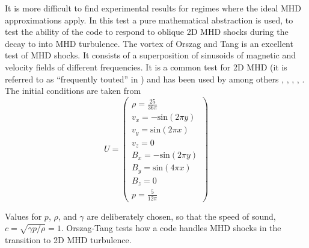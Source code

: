 It is more difficult to find experimental results for regimes where the ideal MHD approximations apply.
In this test a pure mathematical abstraction is used,
to test the ability of the code to respond to oblique 2D MHD shocks during the decay to into MHD turbulence.
The vortex of Orszag and Tang \citep{1979JFM....90..129O} is an excellent test of MHD shocks. 
It consists of a superposition of sinusoids of magnetic and velocity fields of different frequencies. 
It is a common test for 2D MHD (it is referred to as ``frequently touted'' in \citet{2006ApJS..165..188H} ) and has been used by among others 
\cite{2000ApJ...530..508L}, \citet{1999osullivan}, \cite{1998ApJ...494..317D}, \cite{1998ApJ...509..244R}, \citet{1995ApJ...452..785R}.
The initial conditions are taken from \citet{1999osullivan}
\begin{equation}
U = \left( 
\begin{array}{c}
\rho = \frac{25}{36\pi} \\
v_x = -\mathrm{sin}(2\pi y)\\
v_y = \mathrm{sin}(2\pi x)\\
v_z = 0\\
B_x = -\mathrm{sin}(2\pi y)\\
B_y = \mathrm{sin}(4\pi x)\\
B_z = 0\\
p = \frac{5}{12\pi}
\end{array}
\right)
\end{equation}

Values for $p$, $\rho$, and $\gamma$ are deliberately chosen, so that the speed of sound, $c=\sqrt{\gamma p/\rho}=1$.
Orszag-Tang tests how a code handles MHD shocks in the transition to 2D MHD turbulence.


